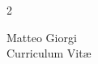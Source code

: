 \documentclass[10pt]{article} %
\begin{document}
\vspace*{0.6\baselineskip}

\begin{paracol}{2} %


    \parbox[top][0.12\textheight][c]{\linewidth}{ %
    \vspace{-0.04\textheight} %
    \centering %
    {\sffamily\Huge Matteo Giorgi}\\
    {\Large\color{headings} Curriculum Vit\ae}
    }




\end{paracol}
\end{document}

